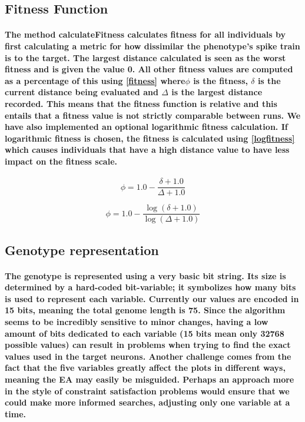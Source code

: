 \documentclass[titlepage,norsk]{article}
\begin{document}
\subsection{Fitness Function}

\paragraph{
The method calculateFitness calculates fitness for all individuals by first calculating a metric for how dissimilar the phenotype’s spike train is to the target. The largest distance calculated is seen as the worst fitness and is given the value 0. All other fitness values are computed as a percentage of this using \eqref{fitness} where$\phi$ is the fitness, $\delta$ is the current distance being evaluated and $\Delta$ is the largest distance recorded. This means that the fitness function is relative and this entails that a fitness value is not strictly comparable between runs. We have also implemented an optional logarithmic fitness calculation. If logarithmic fitness is chosen, the fitness is calculated using \eqref{logfitness} which causes individuals that have a high distance value to have less impact on the fitness scale.
}

\begin{equation}\label{fitness}
\phi = 1.0 - \frac{ \delta +1.0}{\Delta + 1.0}
\end{equation}


\begin{equation}\label{logfitness}
\phi = 1.0 - \frac{ \log{ ( \delta +1.0 ) } }{\log { ( \Delta + 1.0) } }
\end{equation}

\subsection{Genotype representation}
\paragraph{
The genotype is represented using a very basic bit string. Its size is determined by a hard-coded bit-variable; it symbolizes how many bits is used to represent each variable. Currently our values are encoded in 15 bits, meaning the total genome length is 75. Since the algorithm seems to be incredibly sensitive to minor changes, having a low amount of bits dedicated to each variable (15 bits mean only 32768 possible values) can result in problems when trying to find the exact values used in the target neurons.
Another challenge comes from the fact that the five variables greatly affect the plots in different ways, meaning the EA may easily be misguided. Perhaps an approach more in the style of constraint satisfaction problems would ensure that we could make more informed searches, adjusting only one variable at a time.
}
\end{document}
